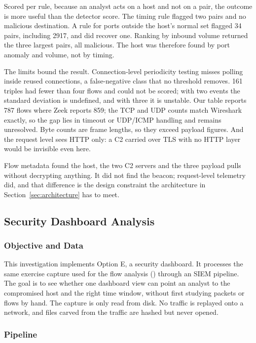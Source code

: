 Scored per rule, because an analyst acts on a host and not on a pair, the outcome is more useful than the detector score. The timing rule flagged two pairs and no malicious destination. A rule for ports outside the host's normal set flagged 34 pairs, including 2917, and did recover one. Ranking by inbound volume returned the three largest pairs, all malicious. The host was therefore found by port anomaly and volume, not by timing.

The limits bound the result. Connection-level periodicity testing misses polling inside reused connections, a false-negative class that no threshold removes. 161 triples had fewer than four flows and could not be scored; with two events the standard deviation is undefined, and with three it is unstable. Our table reports 787 flows where Zeek reports 859; the TCP and UDP counts match Wireshark exactly, so the gap lies in timeout or UDP/ICMP handling and remains unresolved. Byte counts are frame lengths, so they exceed payload figures. And the request level sees HTTP only: a C2 carried over TLS with no HTTP layer would be invisible even here.

Flow metadata found the host, the two C2 servers and the three payload pulls without decrypting anything. It did not find the beacon; request-level telemetry did, and that difference is the design constraint the architecture in Section~\ref{sec:architecture} has to meet.

\subsection{Security Dashboard Analysis}
\label{sec:dashboard-method}

\subsubsection{Objective and Data}

This investigation implements Option E, a security dashboard. It processes the same exercise capture used for the flow analysis () through an SIEM pipeline. The goal is to see whether one dashboard view can point an analyst to the compromised host and the right time window, without first studying packets or flows by hand. The capture is only read from disk. No traffic is replayed onto a network, and files carved from the traffic are hashed but never opened.

\subsubsection{Pipeline}

